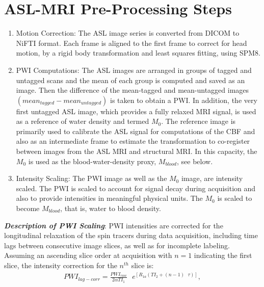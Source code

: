 \documentclass[letterpaper,11pt]{article}
\newcommand{\dis}{\displaystyle}
\newcommand{\s}{\text{ }} %
\begin{document}
\section*{ASL-MRI Pre-Processing Steps}
\begin{enumerate}
\item	Motion Correction: The ASL image series is converted from DICOM to NiFTI format. Each frame is aligned to the first frame to correct for head motion, by a rigid body transformation and least squares fitting, using SPM8.\\

\item	PWI Computations: The ASL images are arranged in groups of tagged and untagged scans and the mean of each group is computed and saved as an image. Then the difference of the mean-tagged and mean-untagged images $(mean_{tagged} - mean_{untagged})$ is taken to obtain a PWI. In addition, the very first untagged ASL image, which provides a fully relaxed MRI signal, is used as a reference of water density and termed $M_{0}$. The reference image is primarily used to calibrate the ASL signal for computations of the CBF and also as an intermediate frame to estimate the transformation to co-register between images from the ASL MRI and structural MRI. In this capacity, the $M_{0}$ is used as the blood-water-density proxy, $M_{blood}$, see below. \\

\item Intensity Scaling: The PWI image as well as the $M_{0}$ image, are intensity scaled. The PWI is scaled  to account for signal decay during acquisition and also to provide intensities in meaningful physical units. The $M_{0}$ is scaled to become  $M_{blood}$, that is, water to blood density.
\end{enumerate}

\emph{{\large \textbf{Description of PWI Scaling}}}:
PWI intensities are corrected for the longitudinal relaxation of the spin tracers during data acquisition, including time lags between consecutive image slices, as well as for incomplete labeling. Assuming an ascending slice order at acquisition with $n=1$ indicating the first slice, the intensity correction for the $n^{th}$ slice is:\\

\begin{align}
\label{eq:scale1}
PWI_{lag-corr} =\dis\frac{PWI_{raw}}{2\alpha{TI_1}}\s e^{\left[R_{1a}(TI_2 + (n - 1)\s\tau )\right]} ,
\end{align} 
\end{document}
